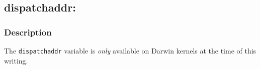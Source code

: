 \clearpage
{}
{}
\label{vars:dispatchaddr}
\subsection*{dispatchaddr:}

\subsubsection*{Description}

The \verb|dispatchaddr| variable is \emph{only} available on Darwin kernels
at the time of this writing.


